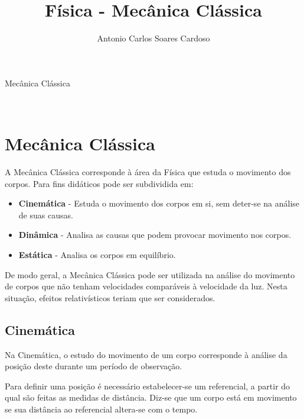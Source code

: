 \documentclass[
    12pt, %
    openright,
    twoside, %
    a4paper, %
    article,
    english,brazil %
]{abntex2}
\author{Antonio Carlos Soares Cardoso}
\title{Física - Mecânica Clássica}
\makeatletter
\renewcommand\tableofcontents{%
  \null\hfill\textbf{\Large\contentsname}\hfill\null\par
  \@mkboth{\MakeUppercase\contentsname}{\MakeUppercase\contentsname}%
  \@starttoc{toc}%
}
\makeatother
\begin{document}
\begin{capa}
    \center
    \ABNTEXchapterfont\Large Mecânica Clássica\\
    \vspace*{1cm}
    {\ABNTEXchapterfont\large\imprimirautor}
    \vfill
    \begin{center}
    \ABNTEXchapterfont\bfseries\LARGE\imprimirtitulo
    \end{center}
    \vfill
    \large\imprimirlocal \\
    \large\imprimirdata
    \vspace*{1cm}
\end{capa}

\tableofcontents

\newpage

\textual

\section{Mecânica Clássica}

A Mecânica Clássica corresponde à área da Física que estuda o movimento dos corpos. Para fins didáticos pode ser subdividida em:

\begin{itemize}
    \item \textbf{Cinemática} - Estuda o movimento dos corpos em si, sem deter-se na análise de suas causas.
    \item \textbf{Dinâmica} - Analisa as causas que podem provocar movimento nos corpos.
    \item \textbf{Estática} - Analisa os corpos em equilíbrio.
\end{itemize}

De modo geral, a Mecânica Clássica pode ser utilizada na análise do movimento de corpos que não tenham velocidades comparáveis à velocidade da luz. Nesta situação, efeitos relativísticos teriam que ser considerados.

\subsection{Cinemática}

Na Cinemática, o estudo do movimento de um corpo corresponde à análise da posição deste durante um período de observação.

Para definir uma posição é necessário estabelecer-se um referencial, a partir do qual são feitas as medidas de distância. Diz-se que um corpo está em movimento se sua distância ao referencial altera-se com o tempo. 
\end{document}
